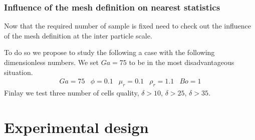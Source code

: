 \subsubsection{Influence of the mesh definition on nearest statistics}

Now that the required number of sample is fixed need to check out the influence of the mesh definition at the inter particle scale. 

To do so we propose to study the following a case with the following dimensionless numbers. 
We set $Ga = 75$ to be in the most disadvantageous situation. 
\begin{align}
    Ga = 75
    & \phi = 0.1
    & \mu_r =0.1 
    & \rho_r = 1.1
    & Bo = 1 
\end{align}
Finlay we test three number of cells quality, $\delta > 10$, $\delta > 25$, $\delta > 35$. 


\section{Experimental design}

